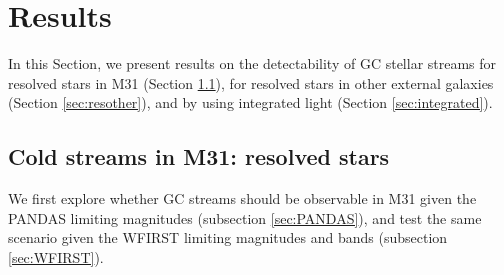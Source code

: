 \documentclass[twocolumn]{aastex62}
\newcommand{\todo}[1]{{\color{red} TODO: #1}}
\begin{document}
%



\section{Results}\label{sec:results}
In this Section, we present results on the detectability of GC stellar streams for resolved stars in M31 (Section \ref{sec:resolved}), for resolved stars in other external galaxies (Section \ref{sec:resother}), and by using integrated light (Section \ref{sec:integrated}). 
 

\subsection{Cold streams in M31: resolved stars}
\label{sec:resolved}
We first explore whether GC streams should be observable in M31 given the PANDAS limiting magnitudes (subsection \ref{sec:PANDAS}), and test the same scenario given the WFIRST limiting magnitudes and bands (subsection \ref{sec:WFIRST}). %
\end{document}
